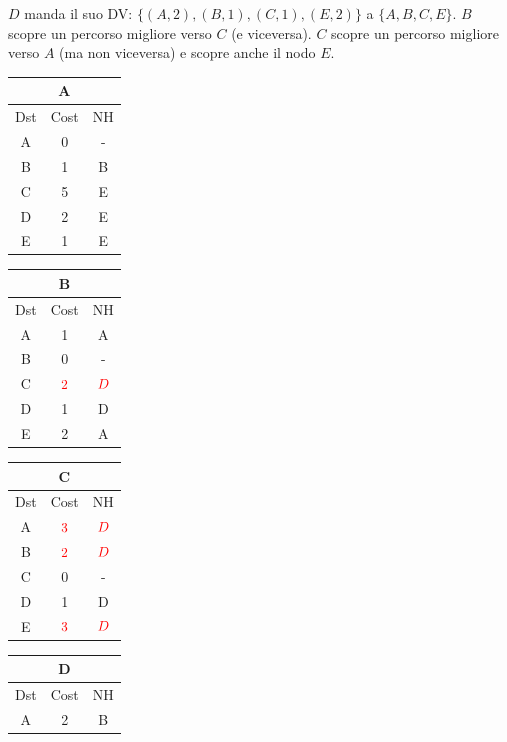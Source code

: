 \documentclass[10pt]{article}
\begin{document}
	\newline \newline
	$D$ manda il suo DV: $\{(A,2),(B,1),(C,1),(E,2)\}$ a $\{A,B,C,E\}$.
	\newline
	$B$ scopre un percorso migliore verso $C$ (e viceversa).
	\newline
	$C$ scopre un percorso migliore verso $A$ (ma non viceversa) e scopre anche il nodo $E$.
	\begin{table}[h!]
		\begin{tabular}{|c||c||c|}
 			\hline
	 		\multicolumn{3}{|c|}{A} \\
 			\hline
 			Dst & Cost & NH\\
 			\hline
 			A & 0 & - \\
 			B & 1 & B \\
 			C & 5 & E \\
 			D & 2 & E \\
 			E & 1 & E \\
 			\hline
		\end{tabular}
		\begin{tabular}{|c||c||c|}
 			\hline
	 		\multicolumn{3}{|c|}{B} \\
 			\hline
 			Dst & Cost & NH\\
 			\hline
 			A & 1 & A \\
 			B & 0 & - \\
 			C & $\color{red} 2$ & $\color{red} D$ \\
 			D & 1 & D \\
 			E & 2 & A \\
 			\hline
		\end{tabular}
		\begin{tabular}{|c||c||c|}
 			\hline
	 		\multicolumn{3}{|c|}{C} \\
 			\hline
 			Dst & Cost & NH\\
 			\hline
 			A & $\color{red} 3$ & $\color{red} D$ \\
 			B & $\color{red} 2$ & $\color{red} D$ \\
 			C & 0 & - \\
 			D & 1 & D \\
 			E & $\color{red} 3$ & $\color{red} D$ \\
 			\hline
		\end{tabular}
		\begin{tabular}{|c||c||c|}
 			\hline
	 		\multicolumn{3}{|c|}{D} \\
 			\hline
 			Dst & Cost & NH\\
 			\hline
 			A & 2 & B \\

\end{tabular}
\end{table}
\end{document}
